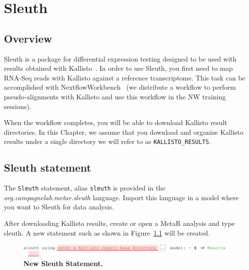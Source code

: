 

\chapter{Sleuth}\label{chap:Sleuth}

\section{Overview}
Sleuth is a package for differential expression testing designed to be used with results obtained with Kallisto~\cite{bray2016near}. In order to use Sleuth, you first need to map RNA-Seq reads with Kallisto against a reference transcriptome. This task can be accomplished with NextflowWorkbench~\cite{kurs2016nextflowworkbench} (we distribute a workflow to perform pseudo-alignments with Kallisto and use this workflow in the NW training sessions). 


When the workflow completes, you will be able to download Kallisto result directories. In this Chapter, we assume that you download and organize Kallisto results under a single directory we will refer to as  \texttt{KALLISTO\_RESULTS}.

\section{Sleuth statement}
The \texttt{Sleuth} statement, alias \texttt{sleuth} is provided in the \textit{org.campagnelab.metar.sleuth} language. Import this language in a model where you want to Sleuth for data analysis.

After downloading Kallisto results, create or open a MetaR analysis and type sleuth. A new statement such as shown in Figure~\ref{fig:NewSleuthStatement} will be created.

\begin{figure}[h!tbp]
  \centering
  \includegraphics[width=\figWidthWide]{figures/NewSleuthStatement-1.pdf}
\caption[New Sleuth Statement.]{\textbf{New Sleuth Statement.}}
\label{fig:NewSleuthStatement}
\end{figure}

